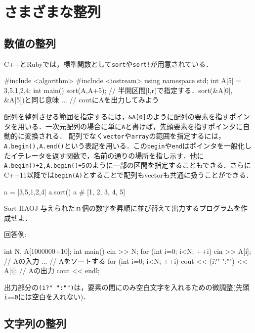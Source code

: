 \section{さまざまな整列}

\subsection{数値の整列}\label{section:sort}

C++とRubyでは，標準関数として\texttt{sort}や\texttt{sort!}が用意されている．
\begin{cbox}[emph={algorithm,sort}]
#include <algorithm>
#include <iostream>
using namespace std;
int A[5] = {3,5,1,2,4};
int main() {
   sort(A,A+5); // 半開区間[l,r)で指定する．sort(\&A[0], \&A[5])と同じ意味
   ... // coutにAを出力してみよう
}
\end{cbox}
配列を整列させる範囲を指定するには，\texttt{\&A[0]}のように配列の要素を指すポインタを用いる．一次元配列の場合に単に\texttt{A}と書けば，先頭要素を指すポインタに自動的に変換される．
配列でなく\texttt{vector}や\texttt{array}の範囲を指定するには，
\texttt{A.begin(),A.end()}という表記を用いる．この\texttt{begin}や\texttt{end}はポインタを一般化したイテレータを返す関数で，名前の通りの場所を指し示す．他に\texttt{A.begin()+2,A.begin()+5}のように一部の区間を指定することもできる．さらにC++11以降では\texttt{begin(A)}とすることで配列もvectorも共通に扱うことができる．

\begin{pybox}[emph=sort]
a = [3,5,1,2,4]
a.sort()
a
# [1, 2, 3, 4, 5]  
\end{pybox}


\begin{psbox}{Sort II}{AOJ}
 与えられたｎ個の数字を昇順に並び替えて出力するプログラムを作成せよ． 

\end{psbox}

回答例:
\begin{cbox}
int N, A[1000000+10];
int main() {
    cin >> N;
    for (int i=0; i<N; ++i) cin >> A[i]; // Aの入力
    ... // Aをソートする
    for (int i=0; i<N; ++i) cout << (i?" ":"") << A[i]; // Aの出力
    cout << endl;
}
\end{cbox}

出力部分の\texttt{(i?" ":"")}は，要素の間にのみ空白文字を入れるための微調整(先頭\texttt{i==0}には空白を入れない)．

\subsection{文字列の整列}

